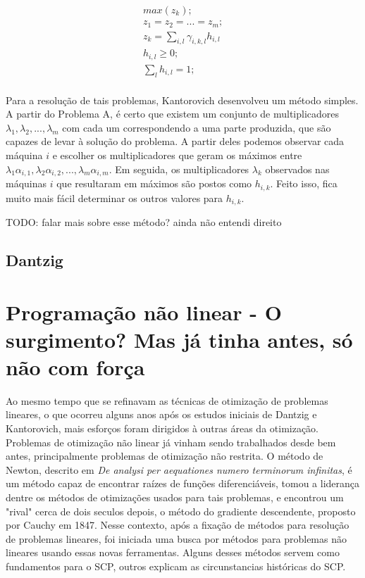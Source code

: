 \begin{align}
  max(z_k); \\
  z_1 = z_2 = ... = z_m; \\
  z_k = \sum_{i, l} \gamma_{i, k, l} h_{i, l} \\
  h_{i, l} \geq 0; \\
  \sum_l h_{i, l} = 1; \\
\end{align}


Para a resolução de tais problemas, Kantorovich desenvolveu um método simples. A partir do
Problema A, é certo que existem um conjunto de multiplicadores \( \lambda_1, \lambda_2, ..., \lambda_m \) com
cada um correspondendo a uma parte produzida, que são capazes de levar à solução do problema.
A partir deles podemos observar cada máquina \(i\) e escolher os multiplicadores que geram os
máximos entre \( \lambda_1\alpha_{i, 1}, \lambda_2\alpha_{i, 2}, ..., \lambda_m\alpha_{i, m} \). Em seguida, os multiplicadores \( \lambda_k \)
observados nas máquinas \(i\) que resultaram em máximos são postos como \(h_{i, k}\). Feito isso,
fica muito mais fácil determinar os outros valores para \( h_{i, k} \).

TODO: falar mais sobre esse método? ainda não entendi direito


\subsection{Dantzig}

\section{Programação não linear - O surgimento? Mas já tinha antes, só não com força}

Ao mesmo tempo que se refinavam as técnicas de otimização de problemas lineares, o que ocorreu
alguns anos após os estudos iniciais de Dantzig e Kantorovich, mais esforços foram dirigidos à
outras áreas da otimização. Problemas de otimização não linear já vinham sendo trabalhados
desde bem antes, principalmente problemas de otimização não restrita. O método de Newton, descrito
em \textit{De analysi per aequationes numero terminorum infinitas}, é um método capaz de encontrar
raízes de funções diferenciáveis, tomou a liderança dentre os métodos de otimizações usados para
tais problemas, e encontrou um "rival" cerca de dois seculos depois, o método do gradiente
descendente, proposto por Cauchy \cite{lemarechal2012cauchy} em 1847. Nesse contexto, após
a fixação de métodos para resolução de problemas lineares, foi iniciada uma busca por métodos para
problemas não lineares usando essas novas ferramentas. Alguns desses métodos servem como fundamentos
para o SCP, outros explicam as circunstancias históricas do SCP.

